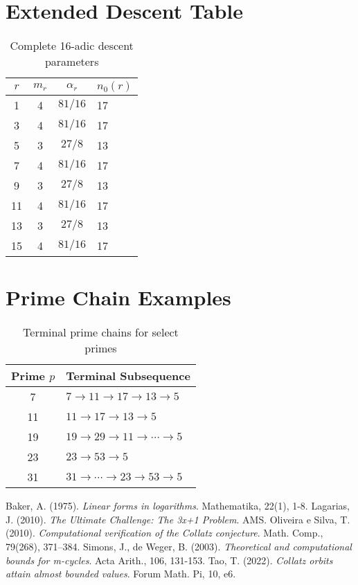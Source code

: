 \documentclass[12pt]{article}
\begin{document}
		\section{Extended Descent Table}
		\begin{table}[H]
			\centering
			\caption{Complete 16-adic descent parameters}\label{tab:descent-full}
			\begin{tabular}{@{}cccl@{}}
				\toprule
				$r$ & $m_r$ & $\alpha_r$ & $n_0(r)$ \\ \midrule
				1 & 4 & $81/16$ & 17 \\
				3 & 4 & $81/16$ & 17 \\
				5 & 3 & $27/8$ & 13 \\
				7 & 4 & $81/16$ & 17 \\
				9 & 3 & $27/8$ & 13 \\
				11 & 4 & $81/16$ & 17 \\
				13 & 3 & $27/8$ & 13 \\
				15 & 4 & $81/16$ & 17 \\ \bottomrule
			\end{tabular}
		\end{table}
		
		\section{Prime Chain Examples}
		\begin{table}[H]
			\centering
			\caption{Terminal prime chains for select primes}\label{tab:prime-chains}
			\begin{tabular}{@{}cl@{}}
				\toprule
				Prime $p$ & Terminal Subsequence \\ \midrule
				7 & $7 \to 11 \to 17 \to 13 \to 5$ \\
				11 & $11 \to 17 \to 13 \to 5$ \\
				19 & $19 \to 29 \to 11 \to \cdots \to 5$ \\ 
				23 & $23 \to 53 \to 5$ \\
				31 & $31 \to \cdots \to 23 \to 53 \to 5$ \\ \bottomrule
			\end{tabular}
		\end{table}
		
		\clearpage   
		
		\begin{thebibliography}{9}
			 Baker, A. (1975). \textit{Linear forms in logarithms}. Mathematika, 22(1), 1-8.
			 Lagarias, J. (2010). \textit{The Ultimate Challenge: The 3x+1 Problem}. AMS.
			 Oliveira e Silva, T. (2010). \textit{Computational verification of the Collatz conjecture}. Math. Comp., 79(268), 371–384.
			 Simons, J., de Weger, B. (2003). \textit{Theoretical and computational bounds for m-cycles}. Acta Arith., 106, 131-153.
			 Tao, T. (2022). \textit{Collatz orbits attain almost bounded values}. Forum Math. Pi, 10, e6.
		\end{thebibliography}
		
	
\end{document}
